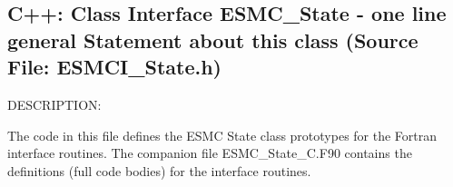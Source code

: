  
\setlength{\oldparskip}{\parskip}
\setlength{\parskip}{1.5ex}
\setlength{\oldparindent}{\parindent}
\setlength{\parindent}{0pt}
\setlength{\oldbaselineskip}{\baselineskip}
\setlength{\baselineskip}{11pt}
 
\def\bv{\begin{verbatim}}
\def\ev{\end{verbatim}}
\def\be{\begin{equation}}
\def\ee{\end{equation}}
\def\bea{\begin{eqnarray}}
\def\eea{\end{eqnarray}}
\def\bi{\begin{itemize}}
\def\ei{\end{itemize}}
\def\bn{\begin{enumerate}}
\def\en{\end{enumerate}}
\def\bd{\begin{description}}
\def\ed{\end{description}}
\def\({\left (}
\def\){\right )}
\def\[{\left [}
\def\]{\right ]}
\def\<{\left  \langle}
\def\>{\right \rangle}
\def\cI{{\cal I}}
\def\diag{\mathop{\rm diag}}
\def\tr{\mathop{\rm tr}}


 
\subsection{C++:  Class Interface ESMC\_State - one line general Statement about this class (Source File: ESMCI\_State.h)}


  
{\sf DESCRIPTION:\\ }


  
   The code in this file defines the ESMC State class prototypes for the
   Fortran interface routines. The companion file ESMC\_State_C.F90  contains
   the definitions (full code bodies) for the interface routines.
  
